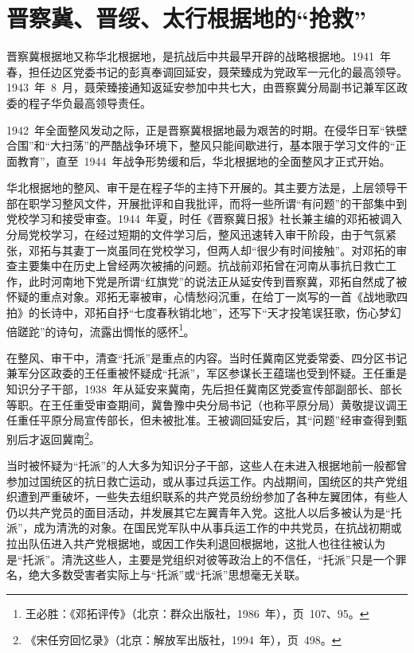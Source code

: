 \section{晋察冀、晋绥、太行根据地的“抢救”}

晋察冀根据地又称华北根据地，是抗战后中共最早开辟的战略根据地。1941~年春，担任边区党委书记的彭真奉调回延安，聂荣臻成为党政军一元化的最高领导。1943~年~8~月，聂荣臻接通知返延安参加中共七大，由晋察冀分局副书记兼军区政委的程子华负最高领导责任。

1942~年全面整风发动之际，正是晋察冀根据地最为艰苦的时期。在侵华日军“铁壁合围”和“大扫荡”的严酷战争环境下，整风只能间歇进行，基本限于学习文件的“正面教育”，直至~1944~年战争形势缓和后，华北根据地的全面整风才正式开始。

华北根据地的整风、审干是在程子华的主持下开展的。其主要方法是，上层领导干部在职学习整风文件，开展批评和自我批评，而将一些所谓“有问题”的干部集中到党校学习和接受审查。1944~年夏，时任《晋察冀日报》社长兼主编的邓拓被调入分局党校学习，在经过短期的文件学习后，整风迅速转入审干阶段，由于气氛紧张，邓拓与其妻丁一岚虽同在党校学习，但两人却“很少有时间接触”。对邓拓的审查主要集中在历史上曾经两次被捕的问题。抗战前邓拓曾在河南从事抗日救亡工作，此时河南地下党是所谓“红旗党”的说法正从延安传到晋察冀，邓拓自然成了被怀疑的重点对象。邓拓无辜被审，心情愁闷沉重，在给丁一岚写的一首《战地歌四拍》的长诗中，邓拓自抒“七度春秋销北地”，还写下“天才投笔误狂歌，伤心梦幻倍蹉跎”的诗句，流露出惆怅的感怀\footnote{王必胜：《邓拓评传》（北京：群众出版社，1986~年），页~107、95。}。

在整风、审干中，清查“托派”是重点的内容。当时任冀南区党委常委、四分区书记兼军分区政委的王任重被怀疑成“托派”，军区参谋长王蕴瑞也受到怀疑。王任重是知识分子干部，1938~年从延安来冀南，先后担任冀南区党委宣传部副部长、部长等职。在王任重受审查期间，冀鲁豫中央分局书记（也称平原分局）黄敬提议调王任重任平原分局宣传部长，但未被批准。王被调回延安后，其“问题”经审查得到甄别后才返回冀南\footnote{《宋任穷回忆录》（北京：解放军出版社，1994~年），页~498。}。

当时被怀疑为“托派”的人大多为知识分子干部，这些人在未进入根据地前一般都曾参加过国统区的抗日救亡运动，或从事过兵运工作。内战期间，国统区的共产党组织遭到严重破坏，一些失去组织联系的共产党员纷纷参加了各种左翼团体，有些人仍以共产党员的面目活动，并发展其它左翼青年入党。这批人以后多被认为是“托派”，成为清洗的对象。在国民党军队中从事兵运工作的中共党员，在抗战初期或拉出队伍进入共产党根据地，或因工作失利退回根据地，这批人也往往被认为是“托派”。清洗这些人，主要是党组织对彼等政治上的不信任，“托派”只是一个罪名，绝大多数受害者实际上与“托派”或“托派”思想毫无关联。

